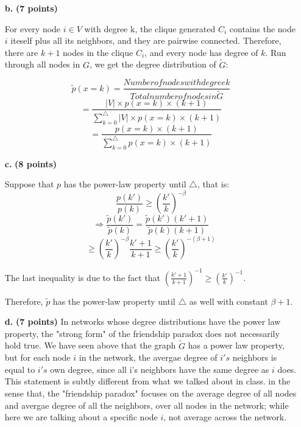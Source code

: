 \documentclass[11pt]{article} %
\begin{document}
\begin{enumerate}
\begin{center}
\begin{tikzpicture}[node distance=2cm, scale=1.5]
\end{tikzpicture}
\end{center}
 



	\item[\textbf{b.}] \textbf{(7 points)} 

For every node $ i\in V$ with degree k, the clique generated $C_i$ contains the node $i$ iteself plus all its neighbors, and they are pairwise connected. Therefore, there are $k+1$ nodes in the clique $C_i$, and every node has degree of $k$. Run through all nodes in $G$, we get the degree distribution of $\widetilde{G}$:

$$ \widetilde{p} (x=k) = \frac{Number of nodes with degree k}{Total number of nodes in \widetilde{G}} $$ 
$$=\frac{|V| \times p(x=k) \times (k+1)}{\sum_{k=0}^\bigtriangleup |V| \times p(x=k) \times (k+1)}$$
$$=\frac{p(x=k) \times (k+1)}{\sum_{k=0}^\bigtriangleup  p(x=k) \times (k+1)}$$

	\item[\textbf{c.}] \textbf{(8 points)}  

Suppose that $p$ has the power-law property until $\bigtriangleup$, that is:
$$ \frac{p(k\prime)}{p(k)} \ge  (\frac{k\prime}{k})^{-\beta}$$ 
$$ \Rightarrow \frac{\widetilde{p}(k\prime)}{\widetilde{p}(k)} = \frac{\widetilde{p}(k\prime) (k\prime+1)}{\widetilde{p}(k) (k+1)} $$
$$ \ge (\frac{k\prime}{k})^{-\beta} \frac{k\prime+1}{k+1} \ge (\frac{k\prime}{k})^{-(\beta+1)}$$ 

The last inequality is due to the fact that $ (\frac{k\prime+1}{k+1})^{-1} \ge (\frac{k\prime}{k})^{-1}$.

Therefore, $\widetilde{p}$ has the power-law property until $\bigtriangleup$ as well with constant $\beta+1$. 


	\item[\textbf{d.}] \textbf{(7 points)} 
In networks whose degree distributions have the power law property, the "strong form" of the friendship paradox does not necessarily hold true. We have seen above that the graph $\widetilde{G}$ has a power law property, but for each node $i$ in the network, the avergae degree of $i's$ neighbors is equal to $i's$ own degree, since all i's neighbors have the same degree as $i$ does. This statement is subtly different from what we talked about in class. in the sense that, the "friendship paradox" focuses on the average degree of all nodes and avergae degree of all the neighbors, over all nodes in the network; while here we are talking about a specific node $i$, not average across the network. 

 
\end{enumerate}
\end{document}
